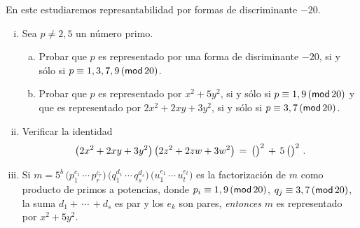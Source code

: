 \begin{ejerDefinidas}\label{ejer:definidas:menos-veinte}
	En este \ejername estudiaremos represantabilidad por formas
	de discriminante $-20$.
	\begin{enumerate}[(i)]
		\item\label{item:ejer:definidas:menos-veinte:i}
			Sea $p\neq 2,5$ un n\'umero primo.
			\begin{enumerate}[(a)]
				\item Probar que $p$ es representado
					por una forma de disriminante
					$-20$, si y s\'olo si
					$p\equiv 1,3,7,9\tmodulo[20]$.
				\item Probar que $p$ es representado
					por $x^2+5y^2$, si y s\'olo si
					$p\equiv 1,9\tmodulo[20]$ y que
					es representado por
					$2x^2+2xy+3y^2$, si y s\'olo si
					$p\equiv 3,7\tmodulo[20]$.
			\end{enumerate}
		\item\label{item:ejer:definidas:menos-veinte:ii}
			Verificar la identidad%
			\begin{displaymath}
				\big(2x^2+2xy+3y^2\big)\,
				\big(2z^2+2zw+3w^2\big)\,=\,
				\big(\big)^2\,+\,
				5\,\big(\big)^2
				\dispstop
			\end{displaymath}
		\item\label{item:ejer:definidas:menos-veinte:iii}
			Si
			\begin{math}
				m=5^b\,
				\big(p_1^{c_1}\,\cdots\,p_r^{c_r}\big)\,
				\big(q_1^{d_1}\,\cdots\,q_s^{d_s}\big)\,
				\big(u_1^{e_1}\,\cdots\,u_t^{e_t}\big)
			\end{math}
			es la factorizaci\'on de $m$ como producto de
			primos a potencias, donde
			$p_i\equiv 1,9\tmodulo[20]$,
			$q_j\equiv 3,7\tmodulo[20]$,
			la suma $d_1+\,\cdots\,+d_s$ es par y
			los $e_k$ son pares, \emph{entonces}
			$m$ es representado por $x^2+5y^2$.
	\end{enumerate}
\end{ejerDefinidas}

